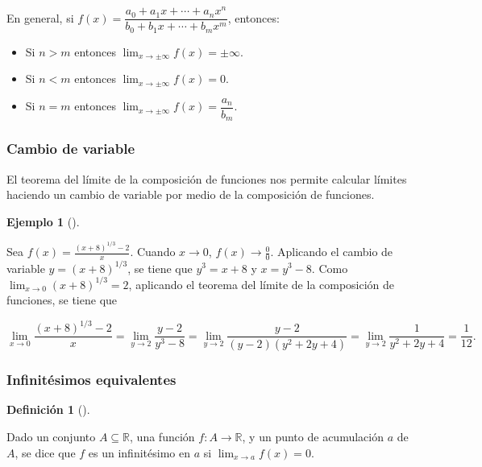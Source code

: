 \documentclass[
  a4paper,
]{scrreport}
\providecommand{\tightlist}{%
  \setlength{\itemsep}{0pt}\setlength{\parskip}{0pt}}\usepackage{longtable,booktabs,array}
\theoremstyle{definition}
\newtheorem{example}{Ejemplo}[chapter]
\theoremstyle{plain}
\theoremstyle{definition}
\newtheorem{definition}{Definición}[chapter]
\theoremstyle{definition}
\theoremstyle{plain}
\theoremstyle{plain}
\theoremstyle{remark}
\begin{document}
En general, si
\(f(x)=\dfrac{a_0+a_1x+\cdots + a_nx^n}{b_0+b_1x+\cdots + b_mx^m}\),
entonces:

\begin{itemize}
\tightlist
\item
  Si \(n>m\) entonces \(\lim_{x\to \pm \infty}f(x)=\pm\infty\).
\item
  Si \(n<m\) entonces \(\lim_{x\to \pm \infty}f(x)=0\).
\item
  Si \(n=m\) entonces \(\lim_{x\to \pm \infty}f(x)=\dfrac{a_n}{b_m}\).
\end{itemize}

\subsubsection{Cambio de variable}\label{cambio-de-variable}

El teorema del límite de la composición de funciones nos permite
calcular límites haciendo un cambio de variable por medio de la
composición de funciones.

\begin{example}[]\protect\hypertarget{exm-limite-cambio-variable}{}\label{exm-limite-cambio-variable}

Sea \(f(x)=\frac{(x+8)^{1/3}-2}{x}\). Cuando \(x\to 0\),
\(f(x)\to \frac{0}{0}\). Aplicando el cambio de variable
\(y=(x+8)^{1/3}\), se tiene que \(y^3=x+8\) y \(x=y^3-8\). Como
\(\lim_{x\to 0}(x+8)^{1/3}=2\), aplicando el teorema del límite de la
composición de funciones, se tiene que

\[
\lim_{x\to 0} \frac{(x+8)^{1/3}-2}{x} = \lim_{y\to 2}\frac{y-2}{y^3-8} = \lim_{y\to 2}\frac{y-2}{(y-2)(y^2+2y+4)} = \lim_{y\to 2} \frac{1}{y^2+2y+4} = \frac{1}{12}.
\]

\end{example}

\subsubsection{Infinitésimos
equivalentes}\label{infinituxe9simos-equivalentes}

\begin{definition}[]\protect\hypertarget{def-infinitesimo}{}\label{def-infinitesimo}

Dado un conjunto \(A\subseteq \mathbb{R}\), una función
\(f:A\to \mathbb{R}\), y un punto de acumulación \(a\) de \(A\), se dice
que \(f\) es un infinitésimo en \(a\) si \(\lim_{x\to a}f(x)=0\).

\end{definition}
\end{document}
